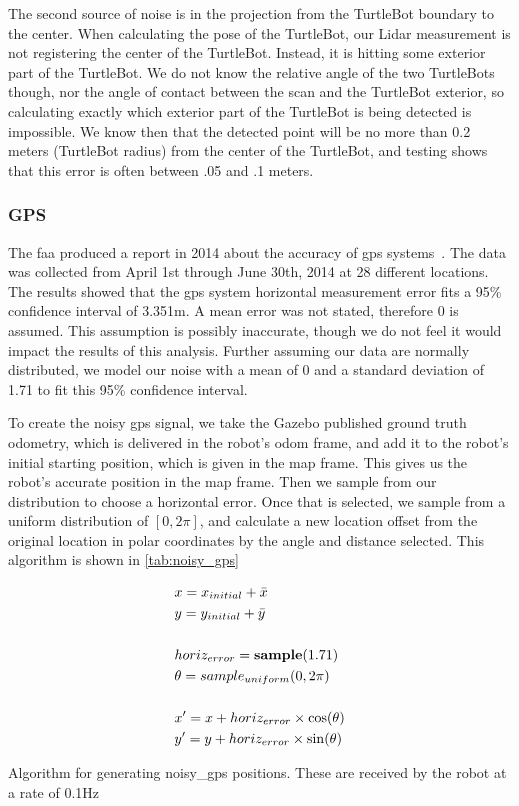 \documentclass[thesis.tex]{subfile}
\begin{document}
The second source of noise is in the projection from the TurtleBot boundary to the center. When calculating the pose of the TurtleBot, our Lidar measurement is not registering the center of the TurtleBot. Instead, it is hitting some exterior part of the TurtleBot. We do not know the relative angle of the two TurtleBots though, nor the angle of contact between the scan and the TurtleBot exterior, so calculating exactly which exterior part of the TurtleBot is being detected is impossible. We know then that the detected point will be no more than 0.2 meters (TurtleBot radius) from the center of the TurtleBot, and testing shows that this error is often between .05 and .1 meters.

\subsubsection{GPS}
The \gls{faa} produced a report in 2014 about the accuracy of \gls{gps} systems~\cite{FAAGPS}. The data was collected from April 1st through June 30th, 2014 at 28 different locations. The results showed that the \gls{gps} system horizontal measurement error fits a 95\% confidence interval of 3.351m. A mean error was not stated, therefore 0 is assumed. This assumption is possibly inaccurate, though we do not feel it would impact the results of this analysis. Further assuming our data are normally distributed, we model our noise with a mean of 0 and a standard deviation of 1.71 to fit this 95\% confidence interval.

To create the noisy \gls{gps} signal, we take the Gazebo published ground truth odometry, which is delivered in the robot's odom frame, and add it to the robot's initial starting position, which is given in the map frame. This gives us the robot's accurate position in the map frame. Then we sample from our distribution to choose a horizontal error. Once that is selected, we sample from a uniform distribution of $[0, 2\pi]$, and calculate a new location offset from the original location in polar coordinates by the angle and distance selected. This algorithm is shown in \cref{tab:noisy_gps}

\begin{table}[htbp]
\centering
\begin{align}
&x = x_{initial} + \bar{x}\\
&y = y_{initial} + \bar{y}\\
\notag \\
&horiz_{error} = \textbf{sample}(1.71)\\
&\theta = \textbf{$sample_{uniform}$}(0, 2\pi)\\
\notag \\
&x' = x + horiz_{error} \times \cos(\theta)\\
&y' = y + horiz_{error} \times \sin(\theta)
\end{align}
\caption{Algorithm for generating noisy\_gps positions. These are received by the robot at a rate of 0.1Hz}
\label{tab:noisy_gps}
\end{table}
\end{document}
